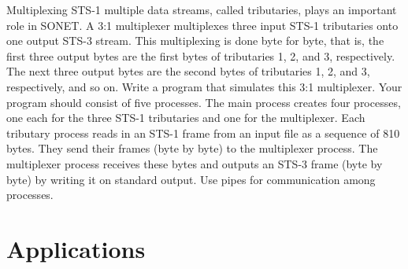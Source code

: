 \documentclass[b5paper,11pt]{memoir}
\begin{document}
{}

Multiplexing STS-1 multiple data streams, called tributaries, plays an
important role in SONET. A 3:1 multiplexer multiplexes three input STS-1
tributaries onto one output STS-3 stream. This multiplexing is done byte
for byte, that is, the first three output bytes are the first bytes of
tributaries 1, 2, and 3, respectively. The next three output bytes are
the second bytes of tributaries 1, 2, and 3, respectively, and so on.
Write a program that simulates this 3:1 multiplexer. Your program should
consist of five processes. The main process creates four processes, one
each for the three STS-1 tributaries and one for the multiplexer. Each
tributary process reads in an STS-1 frame from an input file as a
sequence of 810 bytes. They send their frames (byte by byte) to the
multiplexer process. The multiplexer process receives these bytes and
outputs an STS-3 frame (byte by byte) by writing it on standard output.
Use pipes for communication among processes.



\part{Applications}
\end{document}
